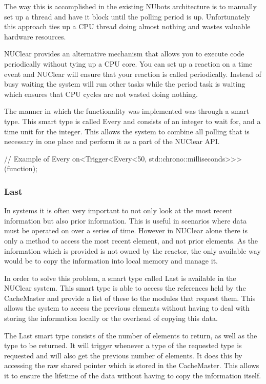 \documentclass[english,12pt]{scrartcl}
\begin{document}
				The way this is accomplished in the existing NUbots architecture is to manually set up a thread and have it block until the polling period is up. 
				Unfortunately this approach ties up a CPU thread doing almost nothing and wastes valuable hardware resources.
				
				NUClear provides an alternative mechanism that allows you to execute code periodically without tying up a CPU core.
				You can set up a reaction on a time event and NUClear will ensure that your reaction is called periodically. 
				Instead of busy waiting the system will run other tasks while the period task is waiting which ensures that CPU cycles are not wasted doing nothing.
				
				The manner in which the functionality was implemented was through a smart type.
				This smart type is called Every and consists of an integer to wait for, and a time unit for the integer.
				This allows the system to combine all polling that is necessary in one place and perform it as a part of the NUClear API.
				
				\begin{cppcode}
				// Example of Every
				on<Trigger<Every<50, std::chrono::milliseconds>>>(function);
				\end{cppcode}	
				
			\subsubsection{Last}
				In systems it is often very important to not only look at the most recent information but also prior information.
				This is useful in scenarios where data must be operated on over a series of time.
				However in NUClear alone there is only a method to access the most recent element, and not prior elements.
				As the information which is provided is not owned by the reactor, the only available way would be to copy the information into local memory and manage it.
				
				In order to solve this problem, a smart type called Last is available in the NUClear system.
				This smart type is able to access the references held by the CacheMaster and provide a list of these to the modules that request them.
				This allows the system to access the previous elements without having to deal with storing the information locally or the overhead of copying this data.
				
				The Last smart type consists of the number of elements to return, as well as the type to be returned.
				It will trigger whenever a type of the requested type is requested and will also get the previous number of elements.
				It does this by accessing the raw shared pointer which is stored in the CacheMaster.
				This allows it to ensure the lifetime of the data without having to copy the information itself.
				
\end{document}

